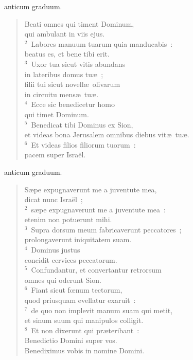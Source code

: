 \bchapter
{}anticum graduum. \begin{flushleft}\begin{verse}\vspace{6pt}Beati omnes qui timent Dominum,\\ qui ambulant in viis ejus.\\
${}^{2}$~Labores manuum tuarum quia manducabis~:\\ beatus es, et bene tibi erit.\\
${}^{3}$~Uxor tua sicut vitis abundans\\ in lateribus domus tu\ae~;\\ filii tui sicut novell\ae\ olivarum\\ in circuitu mens\ae\ tu\ae .\\
${}^{4}$~Ecce sic benedicetur homo\\ qui timet Dominum.\\
${}^{5}$~Benedicat tibi Dominus ex Sion,\\ et videas bona Jerusalem omnibus diebus vit\ae\ tu\ae .\\
${}^{6}$~Et videas filios filiorum tuorum~:\\ pacem super Isra\"el.\end{verse}\end{flushleft}



\bchapter
{}anticum graduum. \begin{flushleft}\begin{verse}\vspace{6pt}S\ae pe expugnaverunt me a juventute mea,\\ dicat nunc Isra\"el~;\\
${}^{2}$~s\ae pe expugnaverunt me a juventute mea~:\\ etenim non potuerunt mihi.\\
${}^{3}$~Supra dorsum meum fabricaverunt peccatores~;\\ prolongaverunt iniquitatem suam.\\
${}^{4}$~Dominus justus\\ concidit cervices peccatorum.\\
${}^{5}$~Confundantur, et convertantur retrorsum\\ omnes qui oderunt Sion.\\
${}^{6}$~Fiant sicut fœnum tectorum,\\ quod priusquam evellatur exaruit~:\\
${}^{7}$~de quo non implevit manum suam qui metit,\\ et sinum suum qui manipulos colligit.\\
${}^{8}$~Et non dixerunt qui pr\ae teribant~:\\ Benedictio Domini super vos.\\ Benediximus vobis in nomine Domini.\end{verse}\end{flushleft}



